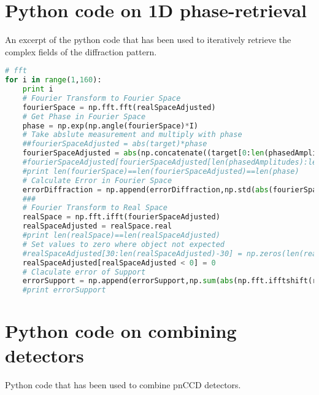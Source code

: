 \section{Python code on 1D phase-retrieval}\label{sec:1d-phase-retrieval-code}
An excerpt of the python code that has been used to iteratively retrieve the complex fields of the diffraction pattern.
\begin{lstlisting}[language=Python,frame=single,basicstyle=\footnotesize]
# fft
for i in range(1,160):
	print i
	# Fourier Transform to Fourier Space
	fourierSpace = np.fft.fft(realSpaceAdjusted)
	# Get Phase in Fourier Space
	phase = np.exp(np.angle(fourierSpace)*I)
	# Take abslute measurement and multiply with phase
	##fourierSpaceAdjusted = abs(target)*phase
	fourierSpaceAdjusted = abs(np.concatenate((target[0:len(phasedAmplitudes)],fourierSpace[len(phasedAmplitudes):len(phasedAmplitudes)*3],target[len(phasedAmplitudes)*3:len(target)]),axis=0))*phase
	#fourierSpaceAdjusted[fourierSpaceAdjusted[len(phasedAmplitudes):len(phasedAmplitudes)*3] > phasedAmplitudes[len(phasedAmplitudes)-1]] = phasedAmplitudes[len(phasedAmplitudes)-1]
	#print len(fourierSpace)==len(fourierSpaceAdjusted)==len(phase)
	# Calculate Error in Fourier Space
	errorDiffraction = np.append(errorDiffraction,np.std(abs(fourierSpace[0:len(phasedAmplitudes)]) - abs(target[0:len(phasedAmplitudes)])))
	###
	# Fourier Transform to Real Space
	realSpace = np.fft.ifft(fourierSpaceAdjusted)
	realSpaceAdjusted = realSpace.real
	#print len(realSpace)==len(realSpaceAdjusted)
	# Set values to zero where object not expected
	#realSpaceAdjusted[30:len(realSpaceAdjusted)-30] = np.zeros(len(realSpaceAdjusted)-60)
	realSpaceAdjusted[realSpaceAdjusted < 0] = 0
	# Claculate error of Support
	errorSupport = np.append(errorSupport,np.sum(abs(np.fft.ifftshift(realSpace)[0:len(realSpace)/2 - 30])))
	#print errorSupport
\end{lstlisting}
\fi
%
%
%
\section{Python code on combining detectors}\label{sec:combination-of-detectors-code}
Python code that has been used to combine pnCCD detectors.

%
%
%